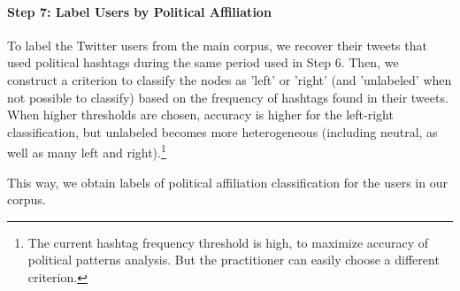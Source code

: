 
            
            \paragraph{Step 7: Label Users by Political Affiliation}
            
            \newline\indent 
            
            To label the Twitter users from the main corpus, we recover their tweets that used political hashtags during the same period used in Step 6. Then, we construct a criterion to classify the nodes as 'left' or 'right' (and 'unlabeled' when not possible to classify) based on the frequency of hashtags found in their tweets. When higher thresholds are chosen, accuracy is higher for the left-right classification, but unlabeled becomes more heterogeneous (including neutral, as well as many left and right).\footnote{The current hashtag frequency threshold is high, to maximize accuracy of political patterns analysis. But the practitioner can easily choose a different criterion. }

            This way, we obtain labels of political affiliation classification %
            for the users in our corpus.        
        
        
        

